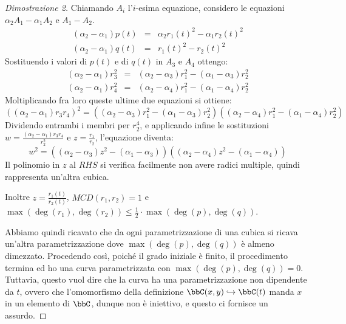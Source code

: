 \begin{proof}[Dimostrazione 2]
Chiamando $A_i$ l'$i$-esima equazione, considero le equazioni $\alpha_2A_1-\alpha_1A_2$ e $A_1-A_2$.
\begin{eqnarray*}
  (\alpha_2-\alpha_1)p(t) &=& \alpha_2r_1(t)^2-\alpha_1r_2(t)^2 \\
  (\alpha_2-\alpha_1)q(t) &=& r_1(t)^2-r_2(t)^2
\end{eqnarray*}
Sostituendo i valori di $p(t)$ e di $q(t)$ in $A_3$ e $A_4$ ottengo:
\begin{eqnarray*}
  (\alpha_2-\alpha_1)r_3^2 &=& (\alpha_2-\alpha_3)r_1^2-(\alpha_1-\alpha_3)r_2^2 \\
  (\alpha_2-\alpha_1)r_4^2 &=& (\alpha_2-\alpha_4)r_1^2-(\alpha_1-\alpha_4)r_2^2
\end{eqnarray*}
Moltiplicando fra loro queste ultime due equazioni si ottiene:
\begin{equation*}
  ((\alpha_2-\alpha_1)r_3r_4)^2 = ((\alpha_2-\alpha_3)r_1^2-(\alpha_1-\alpha_3)r_2^2)((\alpha_2-\alpha_4)r_1^2-(\alpha_1-\alpha_4)r_2^2)
\end{equation*}
Dividendo entrambi i membri per $r_2^4$, e applicando infine le sostituzioni $w=\frac{(\alpha_2-\alpha_1)r_3r_4}{r_2^2}$ e $z=\frac{r_1}{r_2}$, l'equazione diventa:
$$w^2=((\alpha_2-\alpha_3)z^2-(\alpha_1-\alpha_3))((\alpha_2-\alpha_4)z^2-(\alpha_1-\alpha_4))$$
Il polinomio in $z$ al $RHS$ si verifica facilmente non avere radici multiple, quindi rappresenta un'altra cubica.

Inoltre $z=\frac{r_1(t)}{r_2(t)}$, $MCD(r_1,r_2)=1$ e $\max(\deg(r_1), \deg(r_2))\leq\frac{1}{2}\cdot \max(\deg(p),\deg(q))$.

Abbiamo quindi ricavato che da ogni parametrizzazione di una cubica si ricava un'altra parametrizzazione dove $\max(\deg(p),\deg(q))$ è almeno dimezzato.
Procedendo così, poiché il grado iniziale è finito, il procedimento termina ed ho una curva parametrizzata con $\max(\deg(p),\deg(q))=0$. 
Tuttavia, questo vuol dire che la curva ha una parametrizzazione non dipendente da $t$, ovvero che l'omomorfismo della definizione $\bbC(x,y)\hookrightarrow\bbC(t)$ manda $x$ in un elemento di $\bbC$, dunque non è iniettivo, e questo ci fornisce un assurdo.
\end{proof}
